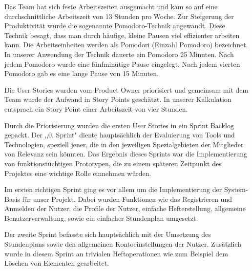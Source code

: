 
Das Team hat sich feste Arbeitszeiten ausgemacht und kam so auf eine durchschnittliche Arbeitszeit von 13 Stunden pro Woche. Zur Steigerung der Produktivität wurde die sogenannte Pomodoro-Technik angewandt. Diese Technik besagt, dass man durch häufige, kleine Pausen viel effizienter arbeiten kann. Die Arbeitseinheiten werden als Pomodori (Einzahl Pomodoro) bezeichnet. In unserer Anwendung der Technik dauerte ein Pomodoro 25 Minuten. Nach jedem Pomodoro wurde eine fünfminütige Pause eingelegt. Nach jedem vierten Pomodoro gab es eine lange Pause von 15 Minuten.


Die User Stories wurden vom Product Owner priorisiert und gemeinsam mit dem Team wurde der Aufwand in Story Points geschätzt. In unserer Kalkulation entsprach ein Story Point einer Arbeitszeit von vier Stunden. 

Durch die Priorisierung wurden die ersten User Stories in ein Sprint Backlog gepackt. Der ,,0. Sprint" diente hauptsächlich der Evaluierung von Tools und Technologien, speziell jener, die in den jeweiligen Spezialgebieten der Mitglieder von Relevanz sein könnten. Das Ergebnis dieses Sprints war die Implementierung von funktionstüchtigen Prototypen, die zu einem späteren Zeitpunkt des Projektes eine wichtige Rolle einnehmen würden.


Im ersten richtigen Sprint ging es vor allem um die Implementierung der System-Basis für unser Projekt. Dabei wurden Funktionen wie das Registrieren und Anmelden der Nutzer, die Profile der Nutzer, einfache Hefterstellung, allgemeine Benutzerverwaltung, sowie ein einfacher Stundenplan umgesetzt.


\newpage

Der zweite Sprint befasste sich hauptsächlich mit der Umsetzung des Stundenplans sowie den allgemeinen Kontoeinstellungen der Nutzer. Zusätzlich wurde in diesem Sprint an trivialen Heftoperationen wie zum Beispiel dem Löschen von Elementen gearbeitet.

